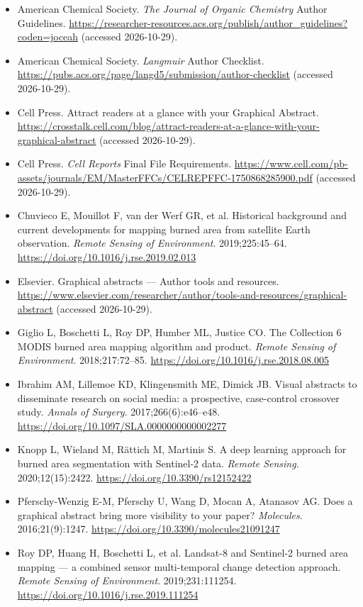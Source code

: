 \begin{itemize}
\item American Chemical Society. \textit{The Journal of Organic Chemistry} Author Guidelines. \url{https://researcher-resources.acs.org/publish/author_guidelines?coden=joceah} (accessed 2026-10-29).
\item American Chemical Society. \textit{Langmuir} Author Checklist. \url{https://pubs.acs.org/page/langd5/submission/author-checklist} (accessed 2026-10-29).
\item Cell Press. Attract readers at a glance with your Graphical Abstract. \url{https://crosstalk.cell.com/blog/attract-readers-at-a-glance-with-your-graphical-abstract} (accessed 2026-10-29).
\item Cell Press. \textit{Cell Reports} Final File Requirements. \url{https://www.cell.com/pb-assets/journals/EM/MasterFFCs/CELREPFFC-1750868285900.pdf} (accessed 2026-10-29).
\item Chuvieco E, Mouillot F, van der Werf GR, et al. Historical background and current developments for mapping burned area from satellite Earth observation. \textit{Remote Sensing of Environment}. 2019;225:45--64. \url{https://doi.org/10.1016/j.rse.2019.02.013}
\item Elsevier. Graphical abstracts --- Author tools and resources. \url{https://www.elsevier.com/researcher/author/tools-and-resources/graphical-abstract} (accessed 2026-10-29).
\item Giglio L, Boschetti L, Roy DP, Humber ML, Justice CO. The Collection 6 MODIS burned area mapping algorithm and product. \textit{Remote Sensing of Environment}. 2018;217:72--85. \url{https://doi.org/10.1016/j.rse.2018.08.005}
\item Ibrahim AM, Lillemoe KD, Klingensmith ME, Dimick JB. Visual abstracts to disseminate research on social media: a prospective, case-control crossover study. \textit{Annals of Surgery}. 2017;266(6):e46--e48. \url{https://doi.org/10.1097/SLA.0000000000002277}
\item Knopp L, Wieland M, R\"attich M, Martinis S. A deep learning approach for burned area segmentation with Sentinel-2 data. \textit{Remote Sensing}. 2020;12(15):2422. \url{https://doi.org/10.3390/rs12152422}
\item Pferschy-Wenzig E-M, Pferschy U, Wang D, Mocan A, Atanasov AG. Does a graphical abstract bring more visibility to your paper? \textit{Molecules}. 2016;21(9):1247. \url{https://doi.org/10.3390/molecules21091247}
\item Roy DP, Huang H, Boschetti L, et al. Landsat-8 and Sentinel-2 burned area mapping --- a combined sensor multi-temporal change detection approach. \textit{Remote Sensing of Environment}. 2019;231:111254. \url{https://doi.org/10.1016/j.rse.2019.111254}
\end{itemize}

